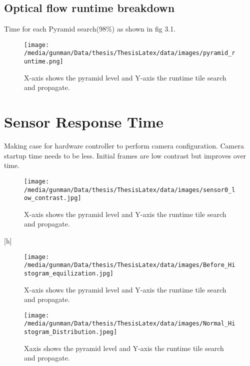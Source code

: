 \subsection{Optical flow runtime breakdown}
Time for each Pyramid search(98\%) as shown in fig 3.1.
\begin{figure}[h]
	\begin{center}
		\texttt{[image: /media/gunman/Data/thesis/ThesisLatex/data/images/pyramid\_runtime.png]}
		\caption{X-axis shows the pyramid level and Y-axis the runtime tile search and propagate.}
		\label{fig:ex_4_9}
	\end{center}
	\vspace{-0.3in}
\end{figure} 

\section{Sensor Response Time}
Making case for hardware controller to perform camera configuration. 
Camera startup time needs to be less. 
	Initial frames are low contrast but improves over time. 
	\begin{figure}[h]
		\begin{center}
			\texttt{[image: /media/gunman/Data/thesis/ThesisLatex/data/images/sensor0\_low\_contrast.jpg]}
			\caption{X-axis shows the pyramid level and Y-axis the runtime tile search and propagate.}
			\label{fig:ex_4_9}
		\end{center}
		\vspace{-0.3in}
	\end{figure}[h]

	\begin{figure*}
	\begin{center}
		\texttt{[image: /media/gunman/Data/thesis/ThesisLatex/data/images/Before\_Histogram\_equilization.jpg]}
		\caption{X-axis shows the pyramid level and Y-axis the runtime tile search and propagate.}
		\label{fig:ex_4_9}
	\end{center}
	\vspace{-0.3in}
\end{figure*} 

	\begin{figure*}
	\begin{center}
		\texttt{[image: /media/gunman/Data/thesis/ThesisLatex/data/images/Normal\_Histogram\_Distribution.jpeg]}
		\caption{Xaxis shows the pyramid level and Y-axis the runtime tile search and propagate.}
		\label{fig:ex_4_9}
	\end{center}
	\vspace{-0.3in}
\end{figure*} 



